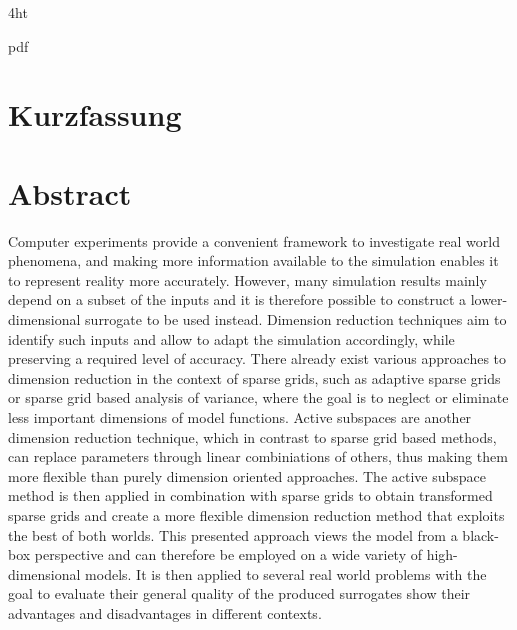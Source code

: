 \documentclass[
  a4paper,  %
  twoside,  %
  bibliography=totoc,
  headsepline,
  cleardoublepage=empty,
  parskip=half,
  draft=false
]{scrbook}
\begin{document}
\iftex4ht
  \Configure{$}{\PicMath}{\EndPicMath}{}

  {pdf}
  {%
  }
\fi



\setcounter{page}{1}
\Titelblatt

\pagestyle{preamble}
\renewcommand*{\chapterpagestyle}{preamble}

\ifdeutsch
  \section*{Kurzfassung}
\else
  \section*{Abstract}
\fi

Computer experiments provide a convenient framework to investigate real world phenomena, and making more information available to the simulation enables it to represent reality more accurately.
However, many simulation results mainly depend on a subset of the inputs and it is therefore possible to construct a lower-dimensional surrogate to be used instead.
Dimension reduction techniques aim to identify such inputs and allow to adapt the simulation accordingly, while preserving a required level of accuracy.
There already exist various approaches to dimension reduction in the context of sparse grids, such as adaptive sparse grids or sparse grid based analysis of variance, where the goal is to neglect or eliminate less important dimensions of model functions.
Active subspaces are another dimension reduction technique, which in contrast to sparse grid based methods, can replace parameters through linear combiniations of others, thus making them more flexible than purely dimension oriented approaches.
The active subspace method is then applied in combination with sparse grids to obtain transformed sparse grids and create a more flexible dimension reduction method that exploits the best of both worlds.
This presented approach views the model from a black-box perspective and can therefore be employed on a wide variety of high-dimensional models.
It is then applied to several real world problems with the goal to evaluate their general quality of the produced surrogates show their advantages and disadvantages in different contexts.
\end{document}
